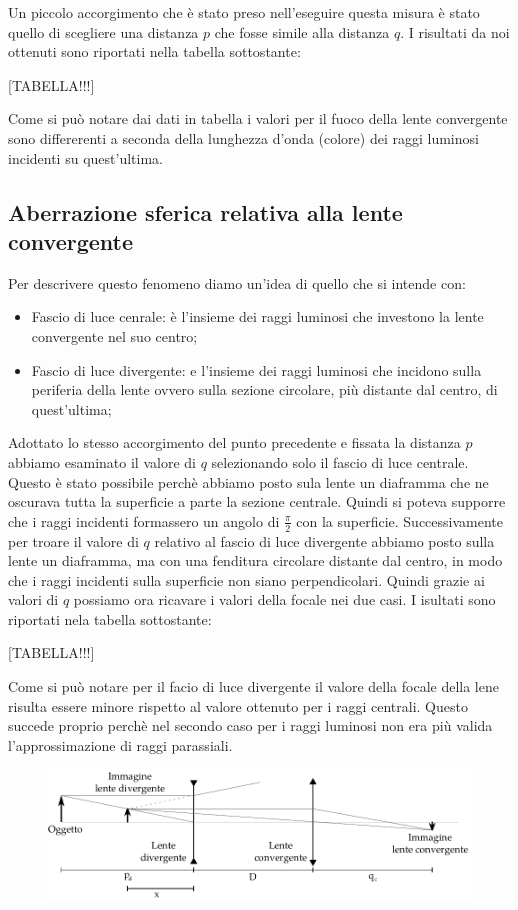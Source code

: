 Un piccolo accorgimento che è stato preso nell'eseguire questa misura è stato quello di scegliere una distanza $p$ che fosse simile alla distanza $q$.
I risultati da noi ottenuti sono riportati nella tabella sottostante:

[TABELLA!!!]

Come si può notare dai dati in tabella i valori per il fuoco della lente convergente sono differerenti a seconda della lunghezza d'onda (colore) dei raggi luminosi incidenti su quest'ultima. 

\subsection{Aberrazione sferica relativa alla lente convergente}

Per descrivere questo fenomeno diamo un'idea di quello che si intende con:
\begin{itemize}
	\item{Fascio di luce cenrale: è l'insieme dei raggi luminosi che investono la lente convergente nel suo centro;}
	\item{Fascio di luce divergente: e l'insieme dei raggi luminosi che incidono sulla periferia della lente ovvero sulla sezione circolare, più distante dal centro, di quest'ultima;}
\end{itemize}
Adottato lo stesso accorgimento del punto precedente e fissata la distanza $p$ abbiamo esaminato il valore di $q$ selezionando solo il fascio di luce centrale. Questo è stato possibile perchè abbiamo posto sula lente un diaframma che ne oscurava tutta la superficie a parte la sezione centrale. Quindi si poteva supporre che i raggi incidenti formassero un angolo di $\frac{\pi}{2}$ con la superficie.
Successivamente per troare il valore di $q$ relativo al fascio di luce divergente abbiamo posto sulla lente un diaframma, ma con una fenditura circolare distante dal centro, in modo che i raggi incidenti sulla superficie non siano perpendicolari.
Quindi grazie ai valori di $q$ possiamo ora ricavare i valori della focale nei due casi. I isultati sono riportati nela tabella sottostante:

[TABELLA!!!]

Come si può notare per il facio di luce divergente il valore della focale della lene risulta essere minore rispetto al valore ottenuto per i raggi centrali. Questo succede proprio perchè nel secondo caso per i raggi luminosi non era più valida l'approssimazione di raggi parassiali.


\begin{figure}[b!]
	\includegraphics[width=16cm]{drawing2.pdf}
\end{figure}

